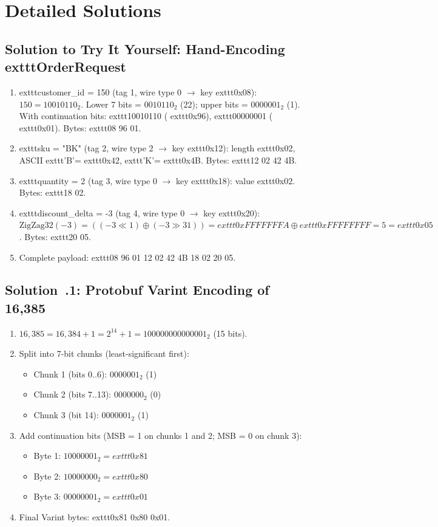 \section{Detailed Solutions}

\subsection{Solution to Try It Yourself: Hand-Encoding 	exttt{OrderRequest}}
\begin{enumerate}[leftmargin=15pt]
  \item 	exttt{customer\_id = 150} (tag 1, wire type 0 $\rightarrow$ key 	exttt{0x08}): $150 = 10010110_2$. Lower 7 bits = $0010110_2$ (22); upper bits = $0000001_2$ (1). With continuation bits: 	exttt{10010110} (	exttt{0x96}), 	exttt{00000001} (	exttt{0x01}). Bytes: 	exttt{08 96 01}.
  \item 	exttt{sku = "BK"} (tag 2, wire type 2 $\rightarrow$ key 	exttt{0x12}): length 	exttt{0x02}, ASCII 	exttt{'B'}=	exttt{0x42}, 	exttt{'K'}=	exttt{0x4B}. Bytes: 	exttt{12 02 42 4B}.
  \item 	exttt{quantity = 2} (tag 3, wire type 0 $\rightarrow$ key 	exttt{0x18}): value 	exttt{0x02}. Bytes: 	exttt{18 02}.
  \item 	exttt{discount\_delta = -3} (tag 4, wire type 0 $\rightarrow$ key 	exttt{0x20}): $\text{ZigZag32}(-3) = ((-3 \ll 1) \oplus (-3 \gg 31)) = 	exttt{0xFFFFFFFA} \oplus 	exttt{0xFFFFFFFF} = 5 = 	exttt{0x05}$. Bytes: 	exttt{20 05}.
  \item Complete payload: 	exttt{08 96 01 12 02 42 4B 18 02 20 05}.
\end{enumerate}

\subsection{Solution~\thechapter.1: Protobuf Varint Encoding of 16,385}
\begin{enumerate}[leftmargin=15pt]
  \item $16{,}385 = 16{,}384 + 1 = 2^{14} + 1 = 100000000000001_2$ (15 bits).
  \item Split into 7-bit chunks (least-significant first):
  \begin{itemize}
    \item Chunk 1 (bits 0..6): $0000001_2$ (1)
    \item Chunk 2 (bits 7..13): $0000000_2$ (0)
    \item Chunk 3 (bit 14): $0000001_2$ (1)
  \end{itemize}
  \item Add continuation bits (MSB = 1 on chunks 1 and 2; MSB = 0 on chunk 3):
  \begin{itemize}
    \item Byte 1: $10000001_2 = 	exttt{0x81}$
    \item Byte 2: $10000000_2 = 	exttt{0x80}$
    \item Byte 3: $00000001_2 = 	exttt{0x01}$
  \end{itemize}
  \item Final Varint bytes: 	exttt{0x81 0x80 0x01}.
\end{enumerate}

